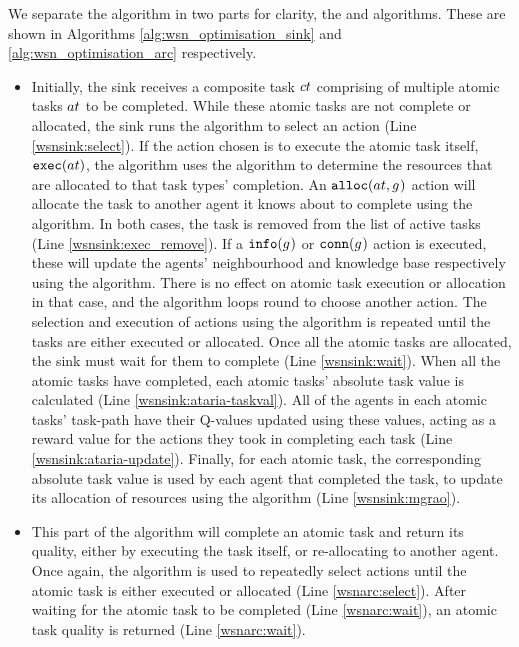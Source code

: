We separate  the \acronymWSNOptimisation{}{} algorithm in two parts for clarity, the \acronymWSNOptimisationSink{}{} and \acronymWSNOptimisationArc{}{} algorithms. These are shown in Algorithms \ref{alg:wsn_optimisation_sink} and \ref{alg:wsn_optimisation_arc} respectively. 

\begin{itemize}
	\item[]  \textbf{\acronymWSNOptimisationSink{}{}} Initially, the sink receives a composite task $\varCompositeTask{}{}$ comprising of multiple atomic tasks $\varAtomicTask{}{}$ to be completed. While these atomic tasks are not complete or allocated, the sink runs the \acronymATARIA{}{} algorithm to select an action (Line \ref{wsnsink:select}).  If the action chosen is to execute the atomic task itself, $\functionExec{}{}$, the algorithm uses the \acronymMGRAO{}{} algorithm to determine the resources that are allocated to that task types' completion. An $\functionAlloc{}{}$ action will allocate the task to another agent it knows about to complete using the \acronymWSNOptimisationArc{}{} algorithm. In both cases, the task is removed from the list of active tasks  (Line \ref{wsnsink:exec_remove}). If a $\functionInfo{}{}$ or $\functionLink{}{}$ action is executed, these will update the agents' neighbourhood and knowledge base respectively using the \acronymATARIA{}{} algorithm. There is no effect on atomic task execution or allocation in that case, and the algorithm loops round to choose another action. The selection and execution of actions using the \acronymATARIA{}{} algorithm is repeated until the tasks are either executed or allocated. Once all the atomic tasks are allocated, the sink must wait for them to complete (Line \ref{wsnsink:wait}). When all the atomic tasks have completed, each atomic tasks' absolute task value is calculated (Line \ref{wsnsink:ataria-taskval}). All of the agents in each atomic tasks' task-path have their Q-values updated using these values, acting as a reward value for the actions they took in completing each task (Line \ref{wsnsink:ataria-update}). Finally, for each atomic task, the corresponding absolute task value is used by each agent that completed the task, to update its allocation of resources using the \acronymMGRAO{}{} algorithm (Line \ref{wsnsink:mgrao}).

	\item[] \textbf{\acronymWSNOptimisationArc{}{}} This part of the algorithm will complete an atomic task and return its quality, either by executing the task itself, or re-allocating to another agent.  Once again,  the \acronymATARIA{}{} algorithm is used to repeatedly select actions until the atomic task is either executed or allocated (Line \ref{wsnarc:select}). After waiting for the atomic task to be completed (Line \ref{wsnarc:wait}),  an atomic task quality is returned (Line \ref{wsnarc:wait}).
\end{itemize}

